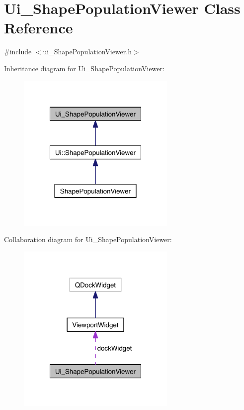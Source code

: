 \hypertarget{class_ui___shape_population_viewer}{\section{Ui\-\_\-\-Shape\-Population\-Viewer Class Reference}
\label{class_ui___shape_population_viewer}
}


{\ttfamily \#include $<$ui\-\_\-\-Shape\-Population\-Viewer.\-h$>$}



Inheritance diagram for Ui\-\_\-\-Shape\-Population\-Viewer\-:\nopagebreak
\begin{figure}[H]
\begin{center}
\leavevmode
\includegraphics[width=216pt]{class_ui___shape_population_viewer__inherit__graph}
\end{center}
\end{figure}


Collaboration diagram for Ui\-\_\-\-Shape\-Population\-Viewer\-:\nopagebreak
\begin{figure}[H]
\begin{center}
\leavevmode
\includegraphics[width=216pt]{class_ui___shape_population_viewer__coll__graph}
\end{center}
\end{figure}
